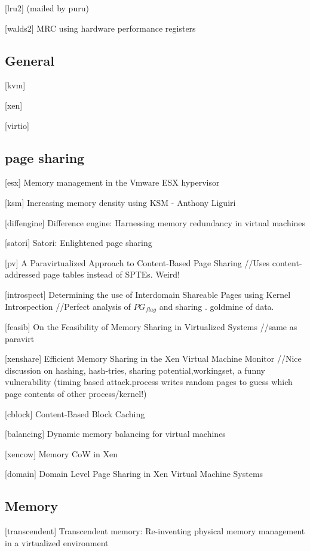 \documentclass[10pt,a4paper]{article}
\begin{document}
[lru2] (mailed by puru)

[walds2] MRC using hardware performance registers 

\subsection{General}

[kvm]

[xen]

[virtio]


\subsection{page sharing}

[esx] Memory management in the Vmware ESX hypervisor 

[ksm] Increasing memory density using KSM - Anthony Liguiri

[diffengine] Difference engine: Harnessing memory redundancy in virtual machines

[satori] Satori: Enlightened page sharing

[pv] A Paravirtualized Approach to Content-Based Page Sharing 
//Uses content-addressed page tables instead of SPTEs. Weird!

[introspect] Determining the use of Interdomain Shareable Pages using Kernel Introspection
//Perfect analysis of $PG_{flag}$ and sharing . goldmine of data.

[feasib] On the Feasibility of Memory Sharing in Virtualized Systems
//same as paravirt

[xenshare] Efficient Memory Sharing in the Xen Virtual Machine Monitor 
//Nice discussion on hashing, hash-tries, sharing potential,workingset, a funny
vulnerability (timing based attack.process writes random pages to
guess which page contents of other process/kernel!)

[cblock] Content-Based Block Caching

[balancing] Dynamic memory balancing for virtual machines

[xencow] Memory CoW in Xen

[domain] Domain Level Page Sharing in Xen Virtual Machine Systems

\subsection{Memory}

[transcendent] Transcendent memory: Re-inventing physical memory management in a virtualized environment
\end{document}
